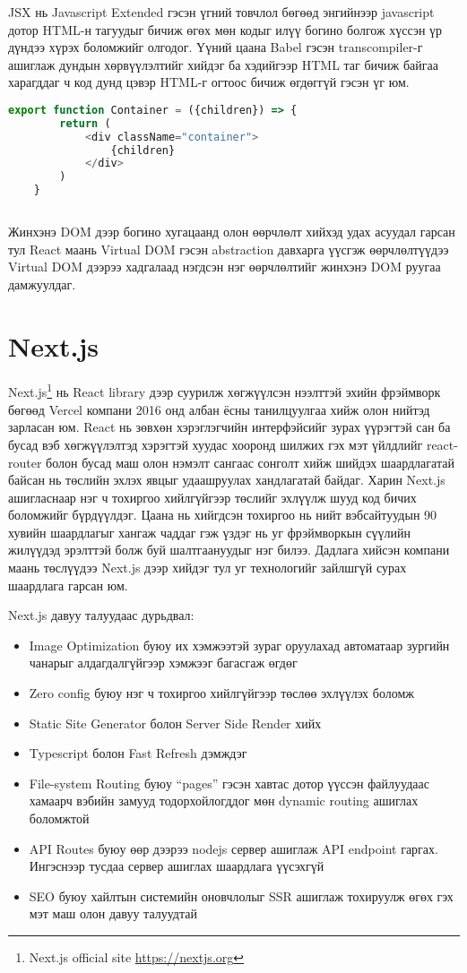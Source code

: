 JSX нь Javascript Extended гэсэн үгний товчлол бөгөөд энгийнээр javascript дотор HTML-н тагуудыг бичиж өгөх мөн кодыг илүү богино болгож хүссэн үр дүндээ хүрэх боломжийг олгодог. Үүний цаана Babel гэсэн transcompiler-г ашиглаж дундын хөрвүүлэлтийг хийдэг ба хэдийгээр HTML таг бичиж байгаа харагддаг ч код дунд цэвэр HTML-г огтоос бичиж өгдөггүй гэсэн үг юм.

\begin{lstlisting}[language=Javascript, caption=JSX ашиглаж "container" класстай html элемент буцаах компонент, frame=single]
	export function Container = ({children}) => {
		return (
			<div className="container">
				{children}
			</div>
		)
	}
			
\end{lstlisting}

Жинхэнэ DOM дээр богино хугацаанд олон өөрчлөлт хийхэд удах асуудал гарсан тул React маань Virtual DOM гэсэн abstraction давхарга үүсгэж өөрчлөлтүүдээ Virtual DOM дээрээ хадгалаад нэгдсэн нэг өөрчлөлтийг жинхэнэ DOM руугаа дамжуулдаг. 

\section{Next.js}
Next.js\footnote{Next.js official site \url{https://nextjs.org}} нь React library дээр суурилж хөгжүүлсэн нээлттэй эхийн фрэймворк бөгөөд Vercel компани 2016 онд албан ёсны танилцуулгаа хийж олон нийтэд зарласан юм. React нь зөвхөн хэрэглэгчийн интерфэйсийг зурах үүрэгтэй сан ба бусад вэб хөгжүүлэлтэд хэрэгтэй хуудас хооронд шилжих гэх мэт үйлдлийг react-router болон бусад маш олон нэмэлт сангаас сонголт хийж шийдэх шаардлагатай байсан нь төслийн эхлэх явцыг удаашруулах хандлагатай байдаг. Харин Next.js ашигласнаар нэг ч тохиргоо хийлгүйгээр төслийг эхлүүлж шууд код бичих боломжийг бүрдүүлдэг. Цаана нь хийгдсэн тохиргоо нь нийт вэбсайтуудын 90 хувийн шаардлагыг хангаж чаддаг гэж үздэг нь уг фрэймворкын сүүлийн жилүүдэд эрэлттэй болж буй шалтгаануудыг нэг билээ. Дадлага хийсэн компани маань төслүүдээ Next.js дээр хийдэг тул уг технологийг зайлшгүй сурах шаардлага гарсан юм. 

Next.js давуу талуудаас дурьдвал:
\begin{itemize}
	\item Image Optimization буюу их хэмжээтэй зураг оруулахад автоматаар зургийн чанарыг алдагдалгүйгээр хэмжээг багасгаж өгдөг
	\item Zero config буюу нэг ч тохиргоо хийлгүйгээр төслөө эхлүүлэх боломж
	\item Static Site Generator болон Server Side Render хийх
	\item Typescript болон Fast Refresh дэмждэг
	\item File-system Routing буюу “pages” гэсэн хавтас дотор үүссэн файлуудаас хамаарч вэбийн замууд тодорхойлогддог мөн dynamic routing ашиглах боломжтой
	\item API Routes буюу өөр дээрээ nodejs сервер ашиглаж API endpoint гаргах. Ингэснээр тусдаа сервер ашиглах шаардлага үүсэхгүй 
	\item SEO буюу хайлтын системийн оновчлолыг SSR ашиглаж тохируулж өгөх гэх мэт маш олон давуу талуудтай
\end{itemize}

